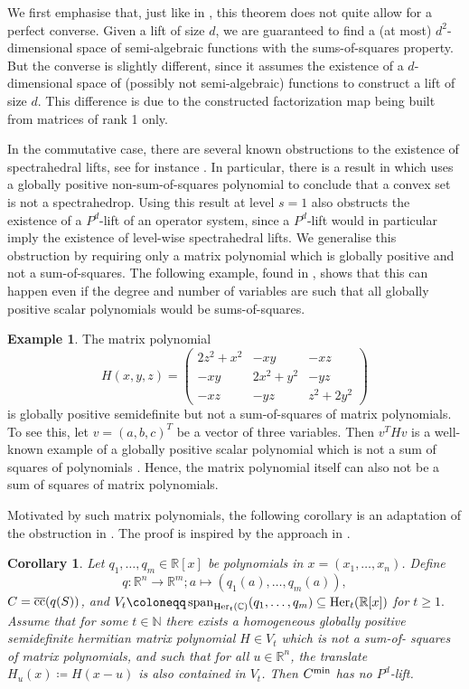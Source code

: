 \documentclass[11pt,onecolumn]{article}
\theoremstyle{plain}
\newtheorem{corollary}[theorem]{Corollary}
\theoremstyle{definition}
\newtheorem{example}[theorem]{Example}
\newcommand{\C}{\mathbb{C}}
\newcommand{\R}{\mathbb{R}}
\newcommand{\N}{\mathbb{N}}
\begin{document}
We first emphasise that, just like in , this theorem does not quite allow for a perfect converse. Given a lift of size \(d\), we are guaranteed to find a (at most) \(d^2\)-dimensional space of semi-algebraic functions with the sums-of-squares property. But the converse is slightly different, since it assumes the existence of a \(d\)-dimensional space of (possibly not semi-algebraic) functions to construct a lift of size \(d\). This difference is due to the constructed factorization map being built from matrices of rank 1 only. 

In the commutative case, there are several known obstructions to the existence of spectrahedral lifts, see for instance \cite{fgpst}. In particular, there is a result in \cite{schei} which uses a globally positive non-sum-of-squares polynomial to conclude that a convex set is not a spectrahedrop. Using this result at level \(s = 1\) also obstructs the existence of a \(P^d\)-lift of an operator system, since a \(P^d\)-lift would in particular imply the existence of level-wise spectrahedral lifts. We generalise this obstruction by requiring only a matrix polynomial which is globally positive and not a sum-of-squares. The following example, found in \cite{hn}, shows that this can happen even if the degree and number of variables are such that all globally positive scalar polynomials would be sums-of-squares.

\begin{example}
    The matrix polynomial
    \[H(x,y,z) =
    \begin{pmatrix}
    	2z^2+x^2&-xy&-xz \\
    	-xy&2x^2+y^2&-yz \\
    	-xz&-yz&z^2+2y^2
    \end{pmatrix}
    \] 
    is globally positive semidefinite but not a sum-of-squares of matrix polynomials. To see this, let \(v = (a, b, c)^T\) be a vector of three variables. Then \(v^T H v\) is a well-known example of a globally positive scalar polynomial which is not a sum of squares of polynomials \cite{choi}. Hence, the matrix polynomial itself can also not be a sum of squares of matrix polynomials.
\end{example}

Motivated by such matrix polynomials, the following corollary is an adaptation of the obstruction in \cite{schei}. The proof is inspired by the approach in \cite{faw}.

\begin{corollary} \label{cor:obstruction}
	Let \(q_1, \dots, q_m \in \R[x]\) be polynomials in \(x = (x_1, \dots, x_n)\). Define \[q\colon \R^n \to \R^m; a \mapsto (q_1(a), \dots, q_m(a)),\] $C=\overline{\rm cc}(q(S))$, and  $V_t \coloneqq \operatorname{span}_{\operatorname{Her}_t(\C)}(q_1, \dots, q_m)\subseteq{\rm Her}_t(\R[x])$ for $t\geqslant 1.$
	Assume that for some \(t \in \N\) there exists a homogeneous globally positive semidefinite hermitian matrix polynomial \(H \in V_t\) which is not a sum-of- squares of matrix polynomials, and such that for all \(u \in \R^n\), the translate \(H_u(x) \coloneqq H(x - u)\) is also contained in \(V_t\).
	Then \(C^\textnormal{min}\) has no $P^d$-lift.
\end{corollary}
\end{document}
